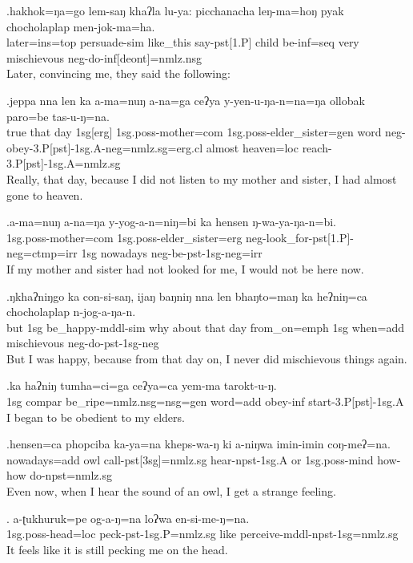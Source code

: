 \exg.hakhok=ŋa=go      lem-saŋ           khaʔla   lu-ya:  picchanacha leŋ-ma=hoŋ      pyak chocholaplap men-jok-ma=ha. \\
 later{\sc =ins=top}  persuade{\sc -sim} like\_this say{\sc -pst[1.P]} child       be{\sc -inf=seq}  very mischievous  {\sc neg-}do{\sc -inf[deont]=nmlz.nsg}\\
Later, convincing me, they said the following: 


\exg.jeppa nna  len ka       a-ma=nuŋ   a-na=ga  ceʔya y-yen-u-ŋa-n=na=ŋa   ollobak paro=be      tas-u-ŋ=na.\\
 true  that day {\sc 1sg[erg]} {\sc 1sg.poss-}mother{\sc =com} {\sc 1sg.poss-}elder\_sister{\sc =gen} word  {\sc neg-}obey{\sc -3.P[pst]-1sg.A-neg=nmlz.sg=erg.cl} almost     heaven{\sc =loc} reach{\sc -3.P[pst]-1sg.A=nmlz.sg}\\
Really, that day, because I did not listen to my mother and sister, I had almost gone to heaven. 

\exg.a-ma=nuŋ                a-na=ŋa                      y-yog-a-n=niŋ=bi                                ka  hensen   ŋ-wa-ya-ŋa-n=bi.\\
 {\sc 1sg.poss-}mother{\sc =com}  {\sc 1sg.poss-}elder\_sister{\sc =erg} {\sc neg-}look\_for{\sc -pst[1.P]-neg=ctmp=irr}  {\sc 1sg} nowadays {\sc neg-}be{\sc -pst-1sg-neg=irr}\\
If my mother and sister had not looked for me, I would not be here now.

\exg.ŋkhaʔniŋgo ka  con-si-saŋ,                    ijaŋ baŋniŋ    nna  len bhaŋto=maŋ      ka  heʔniŋ=ca        chocholaplap n-jog-a-ŋa-n.\\
 but           {\sc 1sg} be\_happy{\sc -mddl-sim} why about    that day  from\_on{\sc =emph} {\sc 1sg} when{\sc =add} mischievous  {\sc neg-}do{\sc -pst-1sg-neg}\\
But I was happy, because from that day on, I never did mischievous things again.

\exg.ka  haʔniŋ tumha=ci=ga                   ceʔya=ca        yem-ma      tarokt-u-ŋ.\\
 {\sc 1sg} {\sc compar}  be\_ripe{\sc =nmlz.nsg=nsg=gen} word{\sc =add} obey{\sc -inf} start{\sc -3.P[pst]-1sg.A}\\
I began to be obedient to my elders.

\exg.hensen=ca          phopciba ka-ya=na                    kheps-wa-ŋ          ki   a-niŋwa           imin-imin coŋ-meʔ=na.\\
 nowadays{\sc =add} owl call{\sc -pst[3sg]=nmlz.sg} hear{\sc -npst-1sg.A} or   {\sc 1sg.poss-}mind how-how  do{\sc -npst=nmlz.sg}\\
Even now, when I hear the sound of an owl, I get a strange feeling.

\exg. a-ʈukhuruk=pe            og-a-ŋ=na                   loʔwa en-si-me-ŋ=na.\\
 {\sc 1sg.poss-}head{\sc =loc} peck{\sc -pst-1sg.P=nmlz.sg} like   perceive{\sc -mddl-npst-1sg=nmlz.sg}\\
It feels like it is still pecking me on the head.





